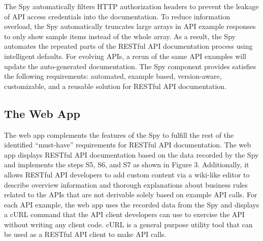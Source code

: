 \documentclass[11pt,oneside]{book}
\begin{document}
The Spy automatically filters HTTP authorization headers to prevent the leakage of API access credentials into the documentation. To reduce information overload, the Spy automatically truncates large arrays in API example responses to only show sample items instead of the whole array. As a result, the Spy automates the repeated parts of the RESTful API documentation process using intelligent defaults. For evolving APIs, a rerun of the same API examples will update the auto-generated documentation. The Spy component provides satisfies the following requirements: automated, example based, version-aware, customizable, and a reusable solution for RESTful API documentation.

\subsection{The Web App}
The web app complements the features of the Spy to fulfill the rest of the identified “must-have” requirements for RESTful API documentation. The web app displays RESTful API documentation based on the data recorded by the Spy and implements the steps S5, S6, and S7 as shown in Figure 3. Additionally, it allows RESTful API developers to add custom content via a wiki-like editor to describe overview information and thorough explanations about business rules related to the APIs that are not derivable solely based on example API calls.
For each API example, the web app uses the recorded data from the Spy and displays a cURL command that the API client developers can use to exercise the API without writing any client code. cURL is a general purpose utility tool that can be used as a RESTful API client to make API calls.
\end{document}
